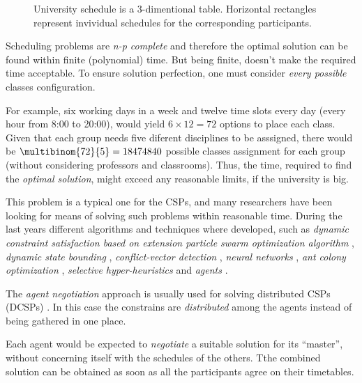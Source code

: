 \begin{figure}
  \label{fig:ScheduleSpace}
  
  \caption{University schedule is a 3-dimentional table. Horizontal rectangles
           represent invividual schedules for the corresponding participants.
          }
\end{figure}


Scheduling problems are \emph{n-p complete} \cite{ULLMAN1975384}
and therefore the optimal solution can be found within finite (polynomial) time.
But being finite, doesn't make the required time acceptable.
To ensure solution perfection, one must consider \emph{every possible} classes
configuration.

For example, six working days in a week and twelve time slots every day
(every hour from 8:00 to 20:00), would yield $6 \times 12 = 72$ options
to place each class.
Given that each group needs five diferent disciplines to be asssigned,
there would be  $\multibinom{72}{5} = 18474840$ possible classes assignment for
each group (without considering professors and classrooms).
Thus, the time, required to find the \emph{optimal solution}, might exceed any
reasonable limits, if the university is big.

This problem is a typical one for the CSPs, and many researchers have
been looking for means of solving such problems within reasonable time.
During the last years different algorithms and techniques where developed,
such as
\emph{dynamic constraint satisfaction based on extension particle swarm
      optimization algorithm} \cite{CSPswarm},
\emph{dynamic state bounding} \cite{CSPdynStateBound},
\emph{conflict-vector detection} \cite{CSPtimetable},
\emph{neural networks} \cite{CSPneuro},
\emph{ant colony optimization} \cite{CSPcunningACO, CSPlimmemACO},
\emph{selective hyper-heuristics} \cite{CSPhypHeur}
and \emph{agents} \cite{CSPagent2013, CSPagent2014, DCSPagent1998}.


The \emph{agent negotiation} approach is usually used for solving distributed
CSPs (DCSPs) \cite{DCSPagent1998, DCSP2013, CSPagent2014}.
In this case the constrains are \emph{distributed} among the agents instead of
being gathered in one place.

Each agent would be expected to \emph{negotiate} a suitable solution for its
``master'', without concerning itself with the schedules of the others.
Tthe combined solution can be obtained as soon as all the participants agree on
their timetables.
